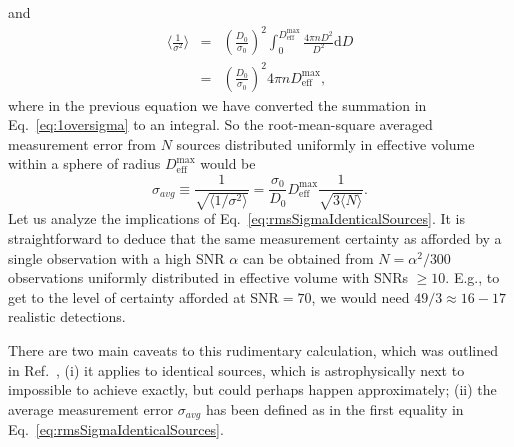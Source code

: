 \documentclass[aps,prd,amsmath,floats,floatfix, twocolumn,
superscriptaddress,nofootinbib,showpacs]{revtex4-1}
\newcommand{\D}{\mathrm{d}}
\newcommand{\deff}{D_\mathrm{eff}}
\begin{document}
and
\begin{eqnarray}
 \langle \frac{1}{\sigma^2}\rangle &=& \left(\frac{D_0}{\sigma_0}\right)^2 \int_0^{\deff^\mathrm{max}} \frac{4\pi n D^2 }{D^2}\D D\\
 &=& \left(\frac{D_0}{\sigma_0}\right)^2 4\pi n \deff^\mathrm{max},
\end{eqnarray}
where in the previous equation we have converted the summation in Eq.~\ref{eq:1oversigma} 
to an integral. So the root-mean-square averaged measurement error from $N$ sources 
distributed uniformly in effective volume within a sphere of radius $\deff^\mathrm{max}$
would be
\begin{equation}\label{eq:rmsSigmaIdenticalSources}
 \sigma_{avg} \equiv \frac{1}{\sqrt{\langle1/\sigma^{2}\rangle}} = \frac{\sigma_0}{D_0} \deff^\mathrm{max} \frac{1}{\sqrt{3\langle N\rangle}}.
\end{equation}
Let us analyze the implications of Eq.~\ref{eq:rmsSigmaIdenticalSources}. It is
straightforward to deduce that the same measurement certainty as afforded by a single
observation with a high SNR $\alpha$ can be obtained from $N = \alpha^2/300$ observations
uniformly distributed in effective volume with SNRs $\geq 10$. E.g., to get to the level 
of certainty afforded at SNR$=70$, we would need $49/3\approx 16-17$ realistic detections.

There are two main caveats to this rudimentary calculation, which was outlined in 
Ref.~\cite{Markakis:2010mp}, (i) it applies to identical sources,
which is astrophysically next to impossible to achieve exactly, but could perhaps happen 
approximately; (ii) the average measurement error $\sigma_{avg}$ has been defined as in 
the first equality in Eq.~\ref{eq:rmsSigmaIdenticalSources}. 

% 
\end{document}
